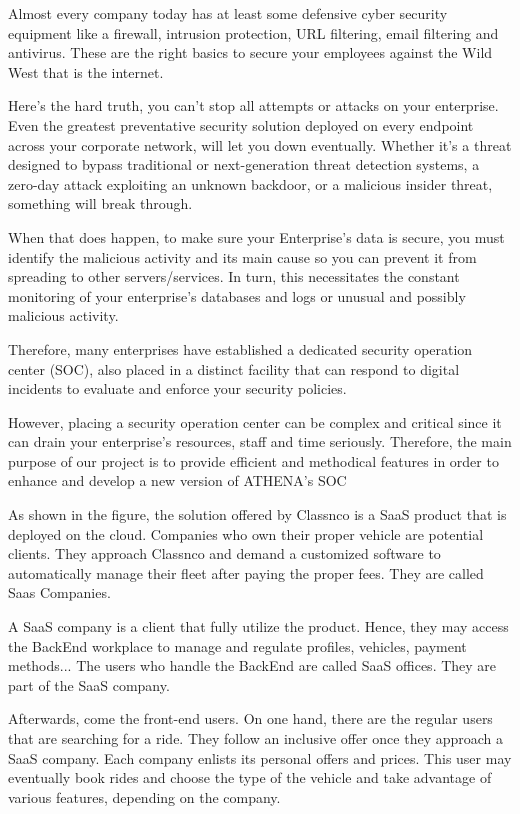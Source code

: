 Almost every company today has at least some defensive cyber security equipment like a firewall, intrusion protection, URL filtering, email filtering and antivirus. These are the right basics to secure your employees against the Wild West that is the internet.

Here’s the hard truth, you can’t stop all attempts or attacks on your enterprise. Even the greatest preventative security solution deployed on every endpoint across your corporate network, will let you down eventually. Whether it’s a threat designed to bypass traditional or next-generation threat detection systems, a zero-day attack exploiting an unknown backdoor, or a malicious insider threat, something will break through.

When that does happen, to make sure your Enterprise's data is secure, you must identify the malicious activity and its main cause so you can prevent it from spreading to other servers/services. In turn, this necessitates the constant monitoring of your enterprise's databases and logs or unusual and possibly malicious activity.

Therefore, many enterprises have established a dedicated security operation center (SOC), also placed in a distinct facility that can respond to digital incidents to evaluate and enforce your security policies.

However, placing a security operation center can be complex and critical since it can drain your enterprise's resources, staff and time seriously. Therefore, the main purpose of our project is to provide efficient and methodical features in order to enhance and develop a new version of ATHENA's SOC 

\ifx

As shown in the figure, the solution offered by Classnco is a SaaS product that is deployed on the cloud. Companies who own their proper vehicle are potential clients. They approach Classnco and demand a customized software to automatically manage their fleet after paying the proper fees. They are called Saas Companies.

A SaaS company is a client that fully utilize the product. Hence, they may access the BackEnd workplace to manage and regulate profiles, vehicles, payment methods...
The users who handle the BackEnd are called SaaS offices. They are part of the SaaS company. 

Afterwards, come the front-end users. On one hand, there are the regular users that are searching for a ride. They follow an inclusive offer once they approach a SaaS company. Each company enlists its personal offers and prices. This user may eventually book rides and choose the type of the vehicle and take advantage of various features, depending on the company.

